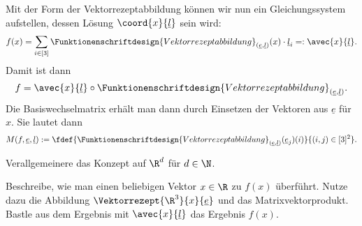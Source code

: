 \documentclass[../WiSe22ANA3.tex]{subfiles}
\begin{document}
		Mit der Form der Vektorrezeptabbildung können wir nun ein Gleichungssystem aufstellen, dessen Lösung $\coord{x}{\underline l}$ sein wird:
		$$f(x)=\sum_{i\in[3]}\Funktionenschriftdesign{Vektorrezeptabbildung}_{(\underline e,\underline l)}(x)\cdot \underline l_i=:\avec{x}{\underline l}.$$
		Damit ist dann 
		$$f=\avec{x}{\underline l}\circ\Funktionenschriftdesign{Vektorrezeptabbildung}_{(\underline e,\underline l)}.$$
		Die Basiswechselmatrix erhält man dann durch Einsetzen der Vektoren aus $\underline e$ für $x$. Sie lautet dann
		$$M(f,\underline e,\underline l):=\fdef{\Funktionenschriftdesign{Vektorrezeptabbildung}_{(\underline e,\underline l)}(\underline e_j)(i)}{(i,j)\in[3]^2}.$$
		\begin{Aufgabe}
			\nr Verallgemeinere das Konzept auf $\R^d$ für $d\in\N$. 
			
			\nr Beschreibe, wie man einen beliebigen Vektor $x\in\R$ zu $f(x)$ überführt. Nutze dazu die Abbildung $\Vektorrezept{\R^3}{x}{\underline e}$ und das Matrixvektorprodukt. Bastle aus dem Ergebnis mit $\avec{x}{\underline l}$ das Ergebnis $f(x)$. 
		\end{Aufgabe}
\end{document}
